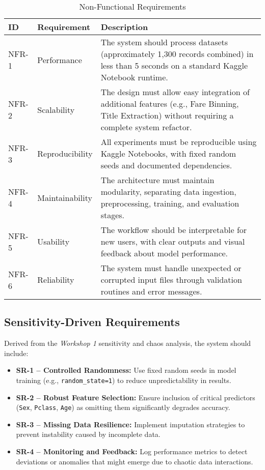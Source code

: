 \documentclass[12pt]{report}
\begin{document}
\begin{table}[H]
\centering
\begin{tabular}{|p{1cm}|p{4cm}|p{9cm}|}
\hline
\textbf{ID} & \textbf{Requirement} & \textbf{Description} \\ \hline
NFR-1 & Performance & The system should process datasets (approximately 1,300 records combined) in less than 5 seconds on a standard Kaggle Notebook runtime. \\ \hline
NFR-2 & Scalability & The design must allow easy integration of additional features (e.g., Fare Binning, Title Extraction) without requiring a complete system refactor. \\ \hline
NFR-3 & Reproducibility & All experiments must be reproducible using Kaggle Notebooks, with fixed random seeds and documented dependencies. \\ \hline
NFR-4 & Maintainability & The architecture must maintain modularity, separating data ingestion, preprocessing, training, and evaluation stages. \\ \hline
NFR-5 & Usability & The workflow should be interpretable for new users, with clear outputs and visual feedback about model performance. \\ \hline
NFR-6 & Reliability & The system must handle unexpected or corrupted input files through validation routines and error messages. \\ \hline
\end{tabular}
\caption{Non-Functional Requirements}
\end{table}

\subsection{Sensitivity-Driven Requirements}

Derived from the \textit{Workshop 1} sensitivity and chaos analysis, the system should include:

\begin{itemize}
    \item \textbf{SR-1 – Controlled Randomness:} Use fixed random seeds in model training (e.g., \texttt{random\_state=1}) to reduce unpredictability in results.
    \item \textbf{SR-2 – Robust Feature Selection:} Ensure inclusion of critical predictors (\texttt{Sex}, \texttt{Pclass}, \texttt{Age}) as omitting them significantly degrades accuracy.
    \item \textbf{SR-3 – Missing Data Resilience:} Implement imputation strategies to prevent instability caused by incomplete data.
    \item \textbf{SR-4 – Monitoring and Feedback:} Log performance metrics to detect deviations or anomalies that might emerge due to chaotic data interactions.
\end{itemize}
\end{document}
